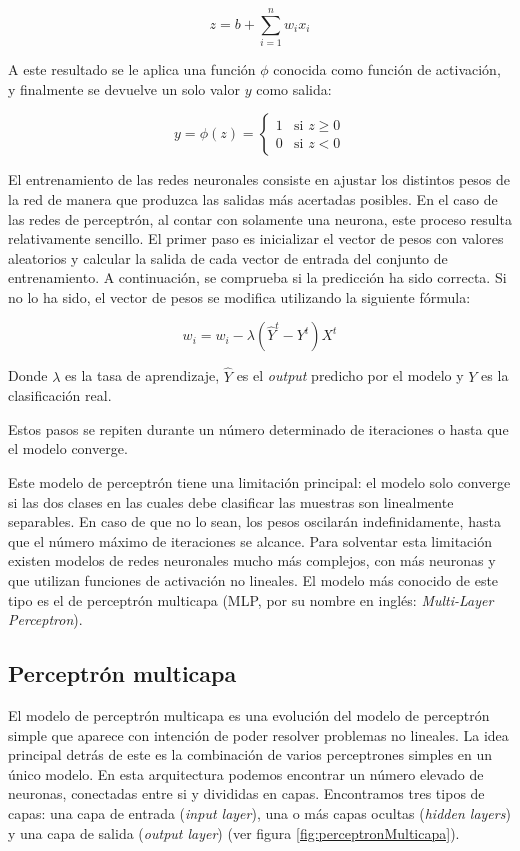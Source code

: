 \documentclass[11pt,spanish,listoffigures,listoftables]{tfgetsinf}
\begin{document}
 \begin{equation}
\label{form:calcularZ}
z = b + \sum_{i = 1}^n w_i x_i
\end{equation}

 A este resultado se le aplica una función $\phi$ conocida como función de activación, y finalmente se devuelve un solo valor $y$ como salida:

\begin{equation}
y = \phi(z) = 
\begin{cases}
	1 & \text{si } z \ge 0 \\
	0 & \text{si } z < 0
\end{cases}
\end{equation}

El entrenamiento de las redes neuronales consiste en ajustar los distintos pesos de la red de manera que produzca las salidas más acertadas posibles. En el caso de las redes de perceptrón, al contar con solamente una neurona, este proceso resulta relativamente sencillo. El primer paso es inicializar el vector de pesos con valores aleatorios y calcular la salida de cada vector de entrada del conjunto de entrenamiento. A continuación, se comprueba si la predicción ha sido correcta. Si no lo ha sido, el vector de pesos se modifica utilizando la siguiente fórmula:

\begin{equation}
w_i = w_i - \lambda(\hat{Y}^t-Y^t)X^t
\end{equation}

Donde $\lambda$ es la tasa de aprendizaje, $\hat{Y}$ es el \textit{output} predicho por el modelo y $Y$ es la clasificación real.

Estos pasos se repiten durante un número determinado de iteraciones o hasta que el modelo converge.

Este modelo de perceptrón tiene una limitación principal: el modelo solo converge si las dos clases en las cuales debe clasificar las muestras son linealmente separables. En caso de que no lo sean, los pesos oscilarán indefinidamente, hasta que el número máximo de iteraciones se alcance. Para solventar esta limitación existen modelos de redes neuronales mucho más complejos, con más neuronas y que utilizan funciones de activación no lineales. El modelo más conocido de este tipo es el de perceptrón multicapa (MLP, por su nombre en inglés: \textit{Multi-Layer Perceptron}).

\subsection{Perceptrón multicapa}
El modelo de perceptrón multicapa es una evolución del modelo de perceptrón simple que aparece con intención de poder resolver problemas no lineales. La idea principal detrás de este es la combinación de varios perceptrones simples en un único modelo. En esta arquitectura podemos encontrar un número elevado de neuronas, conectadas entre si y divididas en capas. Encontramos tres tipos de capas: una capa de entrada (\textit{input layer}), una o más capas ocultas (\textit{hidden layers}) y una capa de salida (\textit{output layer}) (ver figura \ref{fig:perceptronMulticapa}).
\end{document}
